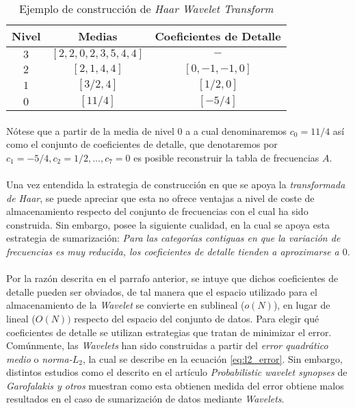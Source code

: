 \documentclass{subfiles}
\begin{document}
          \begin{table}[H]
            \centering
            \begin{tabular}{| c | c | c |}
              \hline
              Nivel & Medias & Coeficientes de Detalle  \\ \hline \hline
              $3$ & $[2,2,0,2,3,5,4,4]$ & $-$         \\ \hline
              $2$ & $[2,1,4,4]$         & $[0,-1,-1,0]$ \\ \hline
              $1$ & $[3/2,4]$           & $[1/2, 0]$    \\ \hline
              $0$ & $[11/4]$            & $[-5/4]$      \\
              \hline
            \end{tabular}
            \caption{Ejemplo de construcción de \emph{Haar Wavelet Transform}}
            \label{table:wavelet_example}
          \end{table}

          \paragraph{}
          Nótese que a partir de la media de nivel 0 a a cual denominaremos $c_0 = 11/4$ así como el conjunto de coeficientes de detalle, que denotaremos por $c_1 = -5/4, c_2 = 1/2, ..., c_7 = 0$ es posible reconstruir la tabla de frecuencias $A$.
          
        \paragraph{}
        Una vez entendida la estrategia de construcción en que se apoya la \emph{transformada de Haar}, se puede apreciar que esta no ofrece ventajas a nivel de coste de almacenamiento respecto del conjunto de frecuencias con el cual ha sido construida. Sin embargo, posee la siguiente cualidad, en la cual se apoya esta estrategia de sumarización: \emph{Para las categorías contiguas en que la variación de frecuencias es muy reducida, los coeficientes de detalle tienden a aproximarse a $0$}.

        \paragraph{}
        Por la razón descrita en el parrafo anterior, se intuye que dichos coeficientes de detalle pueden ser obviados, de tal manera que el espacio utilizado para el almacenamiento de la \emph{Wavelet} se convierte en sublineal ($o(N)$), en lugar de lineal ($O(N))$ respecto del espacio del conjunto de datos. Para elegir qué coeficientes de detalle se utilizan estrategias que tratan de minimizar el error. Comúnmente, las \emph{Wavelets} han sido construidas a partir del \emph{error quadrático medio} o \emph{norma-$L_2$}, la cual se describe en la ecuación \eqref{eq:l2_error}. Sin embargo, distintos estudios como el descrito en el artículo \emph{Probabilistic wavelet synopses} \cite{garofalakis2004probabilistic} de \emph{Garofalakis y otros} muestran como esta obtienen medida del error obtiene malos resultados en el caso de sumarización de datos mediante \emph{Wavelets}.
\end{document}

